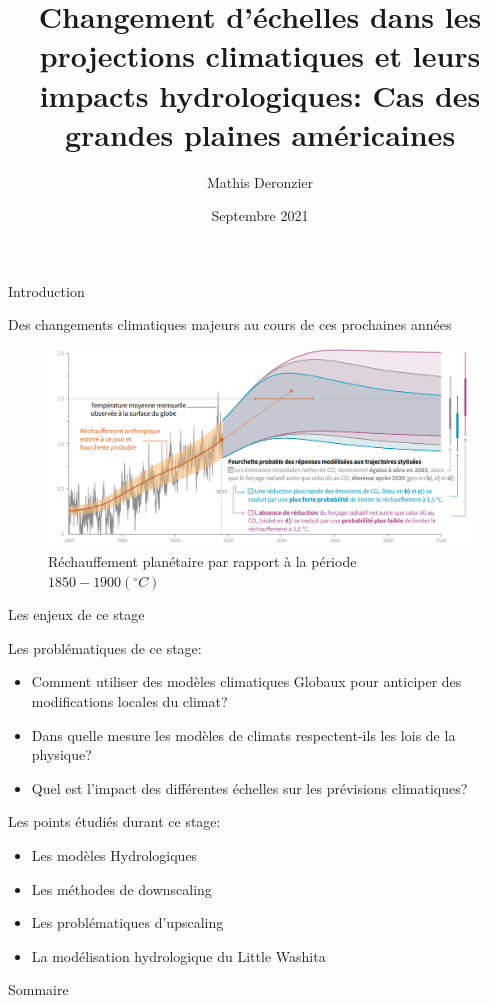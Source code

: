 \documentclass{beamer}
\title{Changement d’échelles dans les projections climatiques et leurs impacts hydrologiques: Cas des grandes plaines américaines}
\author{Mathis Deronzier}
\date{Septembre 2021}
\numberwithin{equation}{section}
\begin{document}
	\frame{\titlepage}
	
	\begin{frame}{Introduction}
		\begin{minipage}[b]{1\linewidth}{Des changements climatiques majeurs au cours de ces prochaines années}
			\begin{figure}
				\includegraphics[scale=0.25]{proj_GIEC.png}
				\caption{Réchauffement planétaire par rapport à la période $1850-1900 (^{\circ}C)$}
			\end{figure}
		\end{minipage}
	\end{frame}
	
	\begin{frame}{Les enjeux de ce stage}
		\begin{block}{Les problématiques de ce stage:}
			\begin{itemize}
				\item Comment utiliser des modèles climatiques Globaux pour anticiper des modifications locales du climat?
				\item Dans quelle mesure les modèles de climats respectent-ils les lois de la physique?
				\item Quel est l'impact des différentes échelles sur les prévisions climatiques?
			\end{itemize}
		\end{block}
		\begin{block}{Les points étudiés durant ce stage:}
			\begin{itemize}
				\item Les modèles Hydrologiques
				\item Les méthodes de downscaling
				\item Les problématiques d'upscaling
				\item La modélisation hydrologique du Little Washita
			\end{itemize}
		\end{block}
	\end{frame}
	\begin{frame}{Sommaire}
		\tableofcontents
	\end{frame}
\end{document}

